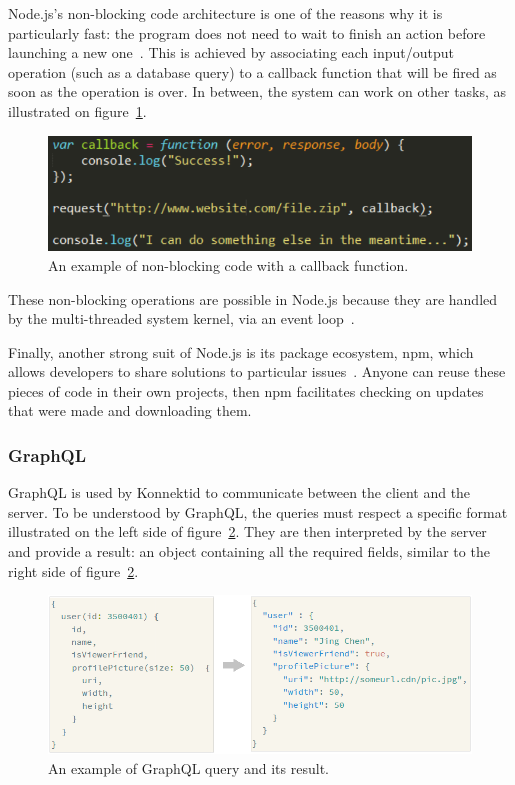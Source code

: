 Node.js's non-blocking code architecture is one of the reasons why it is particularly fast: the program does not need to wait to finish an action before launching a new one~\cite{node}. This is achieved by associating each input/output operation (such as a database query) to a callback function that will be fired as soon as the operation is over. In between, the system can work on other tasks, as illustrated on {\sc figure}~\ref{fig:callback}.

\begin{figure}[H]
    \centering
    \includegraphics[scale=0.8]{figure/callback.png}
    \caption{An example of non-blocking code with a callback function.}
    \label{fig:callback}
\end{figure}

These non-blocking operations are possible in Node.js because they are handled by the multi-threaded system kernel, via an event loop~\cite{eventLoop}.

Finally, another strong suit of Node.js is its package ecosystem, npm, which allows developers to share solutions to particular issues~\cite{npm}. Anyone can reuse these pieces of code in their own projects, then npm facilitates checking on updates that were made and downloading them.

\subsubsection{GraphQL}
\label{sssec:grqphql}

GraphQL is used by Konnektid to communicate between the client and the server. To be understood by GraphQL, the queries must respect a specific format illustrated on the left side of {\sc figure}~\ref{fig:query}. They are then interpreted by the server and provide a result: an object containing all the required fields, similar to the right side of {\sc figure}~\ref{fig:query}.

\begin{figure}[H]
    \centering
    \includegraphics[scale=0.8]{figure/query.png}
    \caption{An example of GraphQL query and its result.}
    \label{fig:query}
\end{figure}

